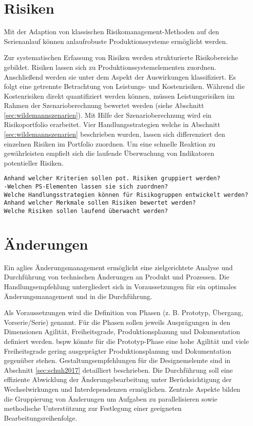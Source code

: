 \section{Risiken}

Mit der Adaption von klassischen Risikomanagement-Methoden auf den Serienanlauf können anlaufrobuste Produktionssysteme ermöglicht werden. 

Zur systematischen Erfassung von Risiken werden strukturierte Risikobereiche gebildet. Risiken lassen sich zu Produktionssystemelementen zuordnen. Anschließend werden sie unter dem Aspekt der Auswirkungen klassifiziert. Es folgt eine getrennte Betrachtung von Leistungs- und Kostenrisiken. 
Während die Kostenrisiken direkt quantifiziert werden können, müssen Leistungsrisiken im Rahmen der Szenarioberechnung bewertet werden (siehe Abschnitt \ref{sec:wildemannszenarien}).
Mit Hilfe der Szenarioberechnung wird ein Risikoportfolio erarbeitet. Vier Handlungsstrategien welche in Abschnitt  \ref{sec:wildemannszenarien} beschrieben wurden, lassen sich differenziert den einzelnen Risiken im Portfolio zuordnen.
Um eine schnelle Reaktion zu gewährleisten empfielt sich die laufende Überwachung von Indikatoren potentieller Risiken. 

\begin{verbatim}
Anhand welcher Kriterien sollen pot. Risiken gruppiert werden?
-Welchen PS-Elementen lassen sie sich zuordnen? 
Welche Handlungsstrategien können für Risikogruppen entwickelt werden?
Anhand welcher Merkmale sollen Risiken bewertet werden?
Welche Risiken sollen laufend überwacht werden?
\end{verbatim}

\section{Änderungen}

Ein aglies Änderungsmanagement ermöglicht eine zielgerichtete Analyse und Durchführung von technischen Änderungen an Produkt und Prozessen. Die Handlungsempfehlung untergliedert sich in Voraussetzungen für ein optimales Änderungsmanagement und in die Durchführung. %

Als Voraussetzungen wird die Definition von Phasen (z. B. Prototyp, Übergang, Vorserie/Serie) genannt. Für die Phasen sollen jeweils Ausprägungen in den Dimensionen Agilität, Freiheitsgrade, Produktionsplanung und Dokumentation definiert werden. \Gls{bspw} könnte für die Prototyp-Phase eine hohe Agilität und viele Freiheitsgrade gering ausgeprägter Produktionsplanung und Dokumentation gegenüber stehen. Gestaltungsempfehlungen für die Designemelemte sind in Abschnitt \ref{sec:schuh2017} detailliert beschrieben. 
Die Durchführung soll eine effiziente Abwicklung der Änderungsbearbeitung unter Berücksichtigung der Wechselwirkungen und Interdependenzen ermöglichen. Zentrale Aspekte bilden die Gruppierung von Änderungen um Aufgaben zu parallelisieren sowie methodische Unterstützung zur Festlegung einer geeigneten Bearbeitungsreihenfolge. 

